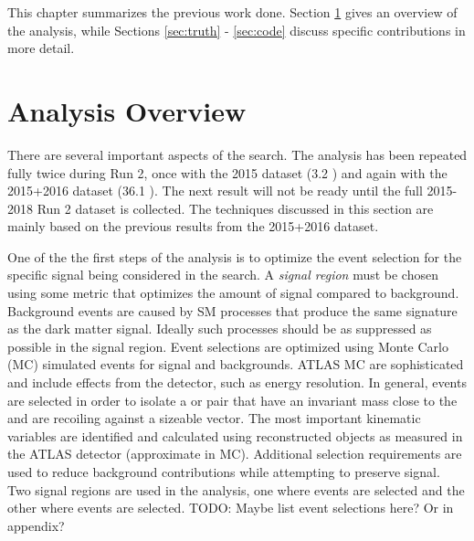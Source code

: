 \label{chapter:prevWork}

This chapter summarizes the previous work done. Section \ref{sec:analysis} gives an overview of the analysis, while Sections \ref{sec:truth} - \ref{sec:code} discuss specific contributions in more detail.

\section{Analysis Overview}
\label{sec:analysis}

There are several important aspects of the \monoZ search. The analysis has been repeated fully twice during Run 2, once with the 2015 dataset (3.2 \ifb) and again with the 2015+2016 dataset (36.1 \ifb). The next result will not be ready until the full 2015-2018 Run 2 dataset is collected. The techniques discussed in this section are mainly based on the previous results from the 2015+2016 dataset. 

One of the the first steps of the analysis is to optimize the event selection for the specific signal being considered in the search. A \textit{signal region} must be chosen using some metric that optimizes the amount of signal compared to background. Background events are caused by SM processes that produce the same signature as the dark matter signal. Ideally such processes should be as suppressed as possible in the signal region. Event selections are optimized using Monte Carlo (MC) simulated events for signal and backgrounds. ATLAS MC are sophisticated and include effects from the detector, such as energy resolution. In general, events are selected in order to isolate a \epem or \mpmm pair that have an invariant mass close to the \Z and are recoiling against a sizeable \etmiss vector. The most important kinematic variables are identified and calculated using reconstructed objects as measured in the ATLAS detector (approximate in MC). Additional selection requirements are used to reduce background contributions while attempting to preserve signal. Two signal regions are used in the \monoZ analysis, one where \epem events are selected and the other where \mpmm events are selected. {\color{red}TODO: Maybe list event selections here? Or in appendix?}

